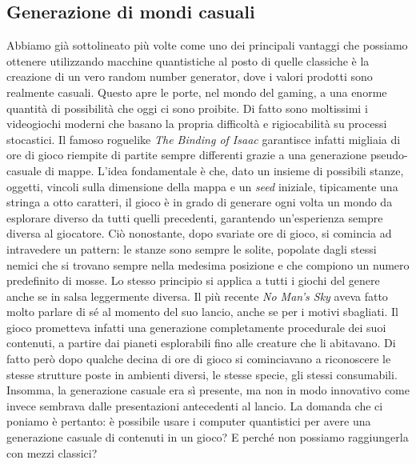 \documentclass{book}
\theoremstyle{definition}
\theoremstyle{definition}
\theoremstyle{definition}
\theoremstyle{plain}
\theoremstyle{plain}
\theoremstyle{plain}
\theoremstyle{plain}
\begin{document}
\subsection{Generazione di mondi casuali}
Abbiamo già sottolineato più volte come uno dei principali vantaggi che possiamo ottenere utilizzando macchine quantistiche al posto di quelle classiche è la creazione di un vero random number generator, dove i valori prodotti sono realmente casuali. Questo apre le porte, nel mondo del gaming, a una enorme quantità di possibilità che oggi ci sono proibite. Di fatto sono moltissimi i videogiochi moderni che basano la propria difficoltà e rigiocabilità su processi stocastici. Il famoso roguelike \emph{The Binding of Isaac}\cite{wiki:The_Binding_of_Isaac:_Rebirth} garantisce infatti migliaia di ore di gioco riempite di partite sempre differenti grazie a una generazione pseudo-casuale di mappe. L'idea fondamentale è che, dato un insieme di possibili stanze, oggetti, vincoli sulla dimensione della mappa e un \emph{seed} iniziale, tipicamente una stringa a otto caratteri, il gioco è in grado di generare ogni volta un mondo da esplorare diverso da tutti quelli precedenti, garantendo un'esperienza sempre diversa al giocatore. Ciò nonostante, dopo svariate ore di gioco, si comincia ad intravedere un pattern: le stanze sono sempre le solite, popolate dagli stessi nemici che si trovano sempre nella medesima posizione e che compiono un numero predefinito di mosse. Lo stesso principio si applica a tutti i giochi del genere anche se in salsa leggermente diversa. Il più recente \emph{No Man's Sky}\cite{wiki:No_Man's_Sky} aveva fatto molto parlare di sé al momento del suo lancio, anche se per i motivi sbagliati. Il gioco prometteva infatti una generazione completamente procedurale dei suoi contenuti, a partire dai pianeti esplorabili fino alle creature che li abitavano. Di fatto però dopo qualche decina di ore di gioco si cominciavano a riconoscere le stesse strutture poste in ambienti diversi, le stesse specie, gli stessi consumabili. Insomma, la generazione casuale era sì presente, ma non in modo innovativo come invece sembrava dalle presentazioni antecedenti al lancio. La domanda che ci poniamo è pertanto: è possibile usare i computer quantistici per avere una generazione casuale di contenuti in un gioco? E perché non possiamo raggiungerla con mezzi classici?\\
\end{document}
